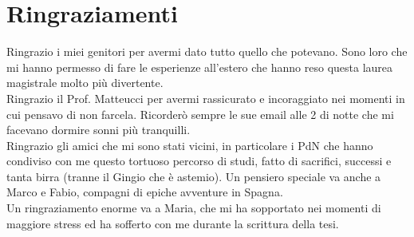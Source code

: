 \chapter*{Ringraziamenti}


Ringrazio i miei genitori per avermi dato tutto quello che potevano. Sono loro che mi hanno permesso di fare le esperienze all'estero che hanno reso questa laurea magistrale molto pi\`{u} divertente.\\
Ringrazio il Prof. Matteucci per avermi rassicurato e incoraggiato nei momenti in cui pensavo di non farcela. Ricorder\`{o} sempre le sue email alle 2 di notte che mi facevano dormire sonni pi\`{u} tranquilli.\\
Ringrazio gli amici che mi sono stati vicini, in particolare i PdN che hanno condiviso con me questo tortuoso percorso di studi, fatto di sacrifici, successi e tanta birra (tranne il Gingio che \`{e} astemio). Un pensiero speciale va anche a Marco e Fabio, compagni di epiche avventure in Spagna.\\
Un ringraziamento enorme va a Maria, che mi ha sopportato nei momenti di maggiore stress ed ha sofferto con me durante la scrittura della tesi.
